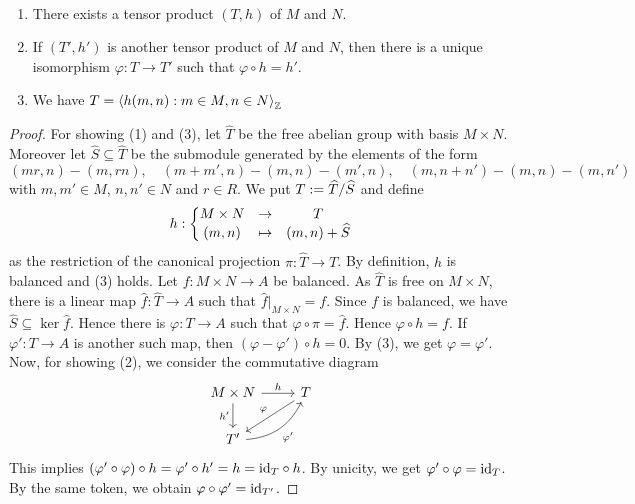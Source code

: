 
\begin{theorem}\label{3.3.4}\
\begin{enumerate}
\item There exists a tensor product $(T,h)$ of $M$ and $N$.
\item If $(T',h')$ is another tensor product of $M$ and $N$, then there is a unique isomorphism $\varphi : T \to T'$ such that $\varphi \circ h = h'$.
\item We have $T = \left\langle h(m,n) : m \in M, n \in N \right\rangle_{\mathbb{Z}}$
\end{enumerate}
\end{theorem}


\begin{proof}
For showing (1) and (3), let $\widehat T$ be the free abelian group with basis $M \times N$. Moreover let $\widehat S \subseteq \widehat T$  be the submodule generated by the elements of the form
\[
(mr, n) - (m, rn),\quad (m + m', n) - (m, n) - (m', n), \quad (m, n+n') - (m, n) - (m, n')
\]
with $m, m' \in M$, $n, n' \in N$ and $r \in R$. We put $T := \widehat T/\widehat S$ and define
\[
h: \left\{ \begin{matrix} M\times N & \to & T \\ (m, n) & \mapsto & (m, n) + \widehat S \end{matrix} \right.
\]
as the restriction of the canonical projection $\pi: \widehat T \to T$. By definition, $h$ is balanced and (3) holds.
Let $f: M \times N \to A$ be balanced. As $\widehat T$ is free on $M \times N$, there is a linear map $\widehat f: \widehat T \to A$ such that ${\widehat f}|_{M \times N} = f$. Since $f$ is balanced, we have $\widehat S \subseteq \ker{\widehat f}$. Hence there is $\varphi : T \to A$
such that $\varphi \circ \pi = \widehat f$. Hence $\varphi \circ h = f$. If $\varphi' : T \to A$ is another such map, then $(\varphi - \varphi') \circ h = 0$. By (3), we get $\varphi = \varphi'$.
Now, for showing (2), we consider the commutative diagram
\[\begin{tikzcd}
      M \times N \dar["h'"'] \rar["h"] & T \ar[ld, "\varphi"']\\
      T' \ar[ru, bend right ,"\varphi'"']
          \end{tikzcd}
\]
This implies $(\varphi' \circ \varphi) \circ h = \varphi' \circ h' = h = {\operatorname{id}_T} \circ h$. By unicity, we get $\varphi' \circ \varphi = \operatorname{id}_T$. By the same token, we obtain $\varphi \circ \varphi' = \operatorname{id}_{T'}$.
\end{proof}

